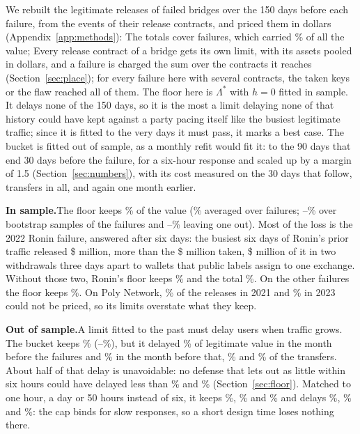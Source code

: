 \documentclass[conference,compsoc]{IEEEtran}
\numberwithin{equation}{section}
\theoremstyle{plain}
\theoremstyle{definition}
\theoremstyle{remark}
\newcommand{\runin}[1]{\par\smallskip\noindent\textbf{#1.}\enspace}
\begin{document}
We rebuilt the legitimate releases of failed bridges over the 150 days before each failure, from the events of their release contracts, and priced them in dollars (Appendix~\ref{app:methods}): \pbSelectionText{} The totals cover \pbNWords{} failures, which carried \pbValueSharePct\% of all the value; \pbApartText{} Every release contract of a bridge gets its own limit, with its assets pooled in dollars, and a failure is charged the sum over the contracts it reaches (Section~\ref{sec:place}); for every failure here with several contracts, the taken keys or the flaw reached all of them. The floor here is $\Lambda^*$ with $h = 0$ fitted in sample. It delays none of the 150 days, so it is the most a limit delaying none of that history could have kept against a party pacing itself like the busiest legitimate traffic; since it is fitted to the very days it must pass, it marks a best case. The bucket is fitted out of sample, as a monthly refit would fit it: to the 90 days that end 30 days before the failure, for a six-hour response and scaled up by a margin of 1.5 (Section~\ref{sec:numbers}), with its cost measured on the 30 days that follow, \pbTestTransfers{} transfers in all, and again one month earlier.



\runin{In sample}The floor keeps \pbFloorPct\% of the value (\pbFloorEventPct\% averaged over failures; \pbFloorLoPct--\pbFloorHiPct\% over bootstrap samples of the failures and \pbFloorLooLoPct--\pbFloorLooHiPct\% leaving one out). Most of the loss is the 2022 Ronin failure, answered after six days: the busiest six days of Ronin's prior traffic released \$\pbRoninEnvM{} million, more than the \$\pbRoninTakenM{} million taken, \$\pbRoninOutsizedM{} million of it in two withdrawals three days apart to wallets that public labels assign to one exchange. Without those two, Ronin's floor keeps \pbRoninFloorTrimPct\% and the total \pbVarFloorPct\%. On the other \pbOthersN{} failures the floor keeps \pbOthersFloorPct\%. On Poly Network, \pbPolyUnpricedPct\% of the releases in 2021 and \pbPolyTwoUnpricedPct\% in 2023 could not be priced, so its limits overstate what they keep.

\runin{Out of sample}A limit fitted to the past must delay users when traffic grows. The bucket keeps \pbBucketPct\% (\pbBucketLoPct--\pbBucketHiPct\%), but it delayed \pbBucketDelayedPct\% of legitimate value in the month before the failures and \pbBucketDelayedTwoPct\% in the month before that, \pbBucketCountPct\% and \pbBucketCountTwoPct\% of the transfers. About half of that delay is unavoidable: no defense that lets out as little within six hours could have delayed less than \dbLowerPct\% and \dbLowerTwoPct\% (Section~\ref{sec:floor}). Matched to one hour, a day or 50 hours instead of six, it keeps \pbBucketOnePct\%, \pbBucketDayPct\% and \pbBucketFiftyPct\% and delays \pbBucketOneDelayedPct\%, \pbBucketDayDelayedPct\% and \pbBucketFiftyDelayedPct\%: the cap binds for slow responses, so a short design time loses nothing there.
\end{document}
